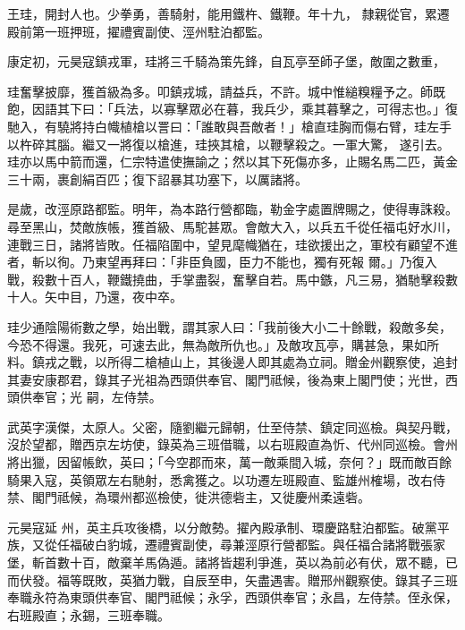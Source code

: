 \begin{pinyinscope}
 王珪，開封人也。少拳勇，善騎射，能用鐵杵、鐵鞭。年十九，
 隸親從官，累遷殿前第一班押班，擢禮賓副使、涇州駐泊都監。



 康定初，元昊寇鎮戎軍，珪將三千騎為策先鋒，自瓦亭至師子堡，敵圍之數重，



 珪奮擊披靡，獲首級為多。叩鎮戎城，請益兵，不許。城中惟縋糗糧予之。師既飽，因語其下曰：「兵法，以寡擊眾必在暮，我兵少，乘其暮擊之，可得志也。」復馳入，有驍將持白幟植槍以詈曰：「誰敢與吾敵者！」槍直珪胸而傷右臂，珪左手以杵碎其腦。繼又一將復以槍進，珪挾其槍，以鞭擊殺之。一軍大驚，
 遂引去。珪亦以馬中箭而還，仁宗特遣使撫諭之；然以其下死傷亦多，止賜名馬二匹，黃金三十兩，裹創絹百匹；復下詔暴其功塞下，以厲諸將。



 是歲，改涇原路都監。明年，為本路行營都臨，勒金字處置牌賜之，使得專誅殺。尋至黑山，焚敵族帳，獲首級、馬駝甚眾。會敵大入，以兵五千從任福屯好水川，連戰三日，諸將皆敗。任福陷圍中，望見麾幟猶在，珪欲援出之，軍校有顧望不進者，斬以徇。乃東望再拜曰：「非臣負國，臣力不能也，獨有死報
 爾。」乃復入戰，殺數十百人，鞭鐵撓曲，手掌盡裂，奮擊自若。馬中鏃，凡三易，猶馳擊殺數十人。矢中目，乃還，夜中卒。



 珪少通陰陽術數之學，始出戰，謂其家人曰：「我前後大小二十餘戰，殺敵多矣，今恐不得還。我死，可速去此，無為敵所仇也。」及敵攻瓦亭，購甚急，果如所料。鎮戎之戰，以所得二槍植山上，其後邊人即其處為立祠。贈金州觀察使，追封其妻安康郡君，錄其子光祖為西頭供奉官、閣門祗候，後為東上閣門使；光世，西頭供奉官；光
 嗣，左侍禁。



 武英字漢傑，太原人。父密，隨劉繼元歸朝，仕至侍禁、鎮定同巡檢。與契丹戰，沒於望都，贈西京左坊使，錄英為三班借職，以右班殿直為忻、代州同巡檢。會州將出獵，因留帳飲，英曰；「今空郡而來，萬一敵乘間入城，奈何？」既而敵百餘騎果入寇，英領眾左右馳射，悉禽獲之。以功遷左班殿直、監雄州榷場，改右侍禁、閣門祗候，為環州都巡檢使，徙洪德砦主，又徙慶州柔遠砦。



 元昊寇延
 州，英主兵攻後橋，以分敵勢。擢內殿承制、環慶路駐泊都監。破黨平族，又從任福破白豹城，遷禮賓副使，尋兼涇原行營都監。與任福合諸將戰張家堡，斬首數十百，敵棄羊馬偽遁。諸將皆趨利爭進，英以為前必有伏，眾不聽，已而伏發。福等既敗，英猶力戰，自辰至申，矢盡遇害。贈邢州觀察使。錄其子三班奉職永符為東頭供奉官、閣門祗候；永孚，西頭供奉官；永昌，左侍禁。侄永保，右班殿直；永錫，三班奉職。




\end{pinyinscope}
